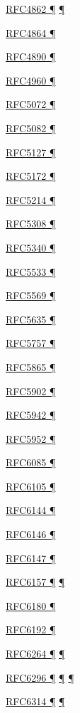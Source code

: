 \documentclass[
]{article}
\begin{document}
\hyperref[auto-configuration]{RFC4862 ¶}
\hyperref[address-and-prefix-management]{¶}

\hyperref[topology-obfuscation]{RFC4864 ¶}

\hyperref[filtering]{RFC4890 ¶}

\hyperref[transport-protocols]{RFC4960 ¶}

\hyperref[layer-2-functions]{RFC5072 ¶}

\hyperref[filtering]{RFC5082 ¶}

\hyperref[traffic-class-and-flow-label]{RFC5127 ¶}

\hyperref[layer-2-functions]{RFC5172 ¶}

\hyperref[obsolete-techniques]{RFC5214 ¶}

\hyperref[routing]{RFC5308 ¶}

\hyperref[routing]{RFC5340 ¶}

\hyperref[multihoming]{RFC5533 ¶}

\hyperref[obsolete-techniques]{RFC5569 ¶}

\hyperref[filtering]{RFC5635 ¶}

\hyperref[address-resolution]{RFC5757 ¶}

\hyperref[traffic-class-and-flow-label]{RFC5865 ¶}

\hyperref[translation-and-ipv4-as-a-service]{RFC5902 ¶}

\hyperref[auto-configuration]{RFC5942 ¶}

\hyperref[addresses]{RFC5952 ¶}

\hyperref[layer-2-functions]{RFC6085 ¶}

\hyperref[layer-2-considerations]{RFC6105 ¶}

\hyperref[translation-and-ipv4-as-a-service]{RFC6144 ¶}

\hyperref[translation-and-ipv4-as-a-service]{RFC6146 ¶}

\hyperref[translation-and-ipv4-as-a-service]{RFC6147 ¶}

\hyperref[dual-stack-scenarios]{RFC6157 ¶} \hyperref[multihoming]{¶}

\hyperref[coexistence-with-legacy-ipv4]{RFC6180 ¶}

\hyperref[filtering]{RFC6192 ¶}

\hyperref[obsolete-techniques]{RFC6264 ¶} \hyperref[tunnels]{¶}

\hyperref[translation-and-ipv4-as-a-service]{RFC6296 ¶}
\hyperref[security]{¶} \hyperref[multihoming]{¶}

\hyperref[translation-and-ipv4-as-a-service]{RFC6314 ¶}
\hyperref[multihoming]{¶}
\end{document}
